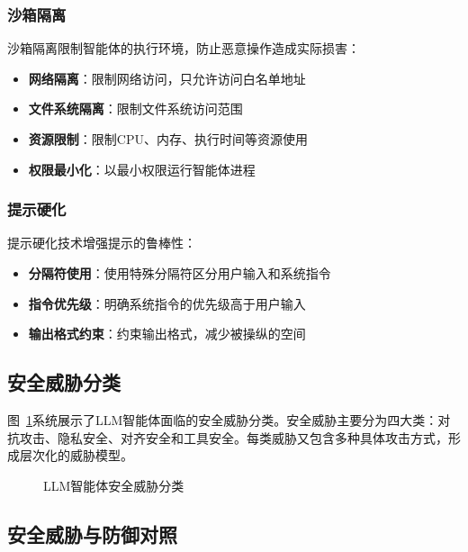 \subsubsection{沙箱隔离}

沙箱隔离限制智能体的执行环境，防止恶意操作造成实际损害：

\begin{itemize}[leftmargin=2em]
    \item \textbf{网络隔离}：限制网络访问，只允许访问白名单地址
    \item \textbf{文件系统隔离}：限制文件系统访问范围
    \item \textbf{资源限制}：限制CPU、内存、执行时间等资源使用
    \item \textbf{权限最小化}：以最小权限运行智能体进程
\end{itemize}

\subsubsection{提示硬化}

提示硬化技术增强提示的鲁棒性：

\begin{itemize}[leftmargin=2em]
    \item \textbf{分隔符使用}：使用特殊分隔符区分用户输入和系统指令
    \item \textbf{指令优先级}：明确系统指令的优先级高于用户输入
    \item \textbf{输出格式约束}：约束输出格式，减少被操纵的空间
\end{itemize}

\subsection{安全威胁分类}

图~\ref{fig:security-threats}系统展示了LLM智能体面临的安全威胁分类。安全威胁主要分为四大类：对抗攻击、隐私安全、对齐安全和工具安全。每类威胁又包含多种具体攻击方式，形成层次化的威胁模型。

\begin{figure}[htbp]
    \centering
    
    \caption{LLM智能体安全威胁分类}
    \label{fig:security-threats}
\end{figure}

\subsection{安全威胁与防御对照}


